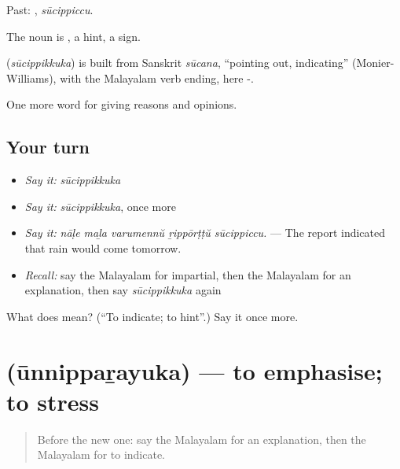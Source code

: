 Past: , \emph{sūcippiccu}.

The noun is , a hint, a sign.

\begin{cousinweb}
\textbf{} (\emph{sūcippikkuka}) is built from Sanskrit \emph{sūcana}, \textquotedblleft{}pointing out, indicating\textquotedblright{} (Monier-Williams), with the Malayalam verb ending, here -.
\end{cousinweb}

\begin{grammarlens}[title={What you've built}]
One more word for giving reasons and opinions.
\end{grammarlens}

\subsection*{Your turn}
\begin{itemize}
\raggedright
  \item \emph{Say it:} \emph{sūcippikkuka}
  \item \emph{Say it:} \emph{sūcippikkuka}, once more
  \item \emph{Say it:} \emph{nāḷe maḻa varumennŭ ṟippōrṭṭŭ sūcippiccu.} — The report indicated that rain would come tomorrow.
  \item \emph{Recall:} say the Malayalam for impartial, then the Malayalam for an explanation, then say \emph{sūcippikkuka} again
\end{itemize}

\begin{tcolorbox}[breakable,colback=teal!4,colframe=teal!35!black,title={Before you move on}]
What does  mean? (\textquotedblleft{}To indicate; to hint\textquotedblright{}.) Say it once more.
\end{tcolorbox}
\section[\texorpdfstring{\ml{ഊന്നിപ്പറയുക} (ūnnippaṟayuka)}{ഊന്നിപ്പറയുക (ūnnippaṟayuka)}]{ (ūnnippaṟayuka) — to emphasise; to stress}

\label{lesson:ML-C410-unnipparayuka}



\begin{quote}
Before the new one: say the Malayalam for an explanation, then the Malayalam for to indicate.
\end{quote}

